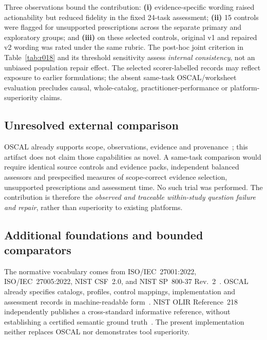 \documentclass[12pt,a4paper]{article}
\begin{document}
Three observations bound the contribution: \textbf{(i)} evidence-specific wording raised actionability but reduced fidelity in the fixed 24-task assessment; \textbf{(ii)} 15 controls were flagged for unsupported prescriptions across the separate primary and exploratory groups; and \textbf{(iii)} on these selected controls, original v1 and repaired v2 wording was rated under the same rubric. The post-hoc joint criterion in Table~\ref{tab:r018} and its threshold sensitivity assess \emph{internal consistency}, not an unbiased population repair effect. The selected scorer-labelled records may reflect exposure to earlier formulations; the absent same-task OSCAL/worksheet evaluation precludes causal, whole-catalog, practitioner-performance or platform-superiority claims.

\subsection{Unresolved external comparison}
OSCAL already supports scope, observations, evidence and provenance~\cite{NIST_OSCAL_2026}; this artifact does not claim those capabilities as novel. A same-task comparison would require identical source controls and evidence packs, independent balanced assessors and prespecified measures of scope-correct evidence selection, unsupported prescriptions and assessment time. No such trial was performed. The contribution is therefore the \emph{observed and traceable within-study question failure and repair}, rather than superiority to existing platforms.

\subsection{Additional foundations and bounded comparators}
\label{sec:rw-oscal}
The normative vocabulary comes from ISO/IEC~27001:2022, ISO/IEC~27005:2022, NIST CSF~2.0, and NIST SP~800-37 Rev.~2~\cite{ISO27001_2022,ISO27005_2022,NIST_CSF_2_0,NIST_SP800_37_R2}. OSCAL already specifies catalogs, profiles, control mappings, implementation and assessment records in machine-readable form~\cite{NIST_OSCAL_2026,NIST_OSCAL_ControlMapping_Online}. NIST OLIR Reference~218 independently publishes a cross-standard informative reference, without establishing a certified semantic ground truth~\cite{NIST_OLIR_218,NIST_OLIR_FAQ}. The present implementation neither replaces OSCAL nor demonstrates tool superiority.
\end{document}
